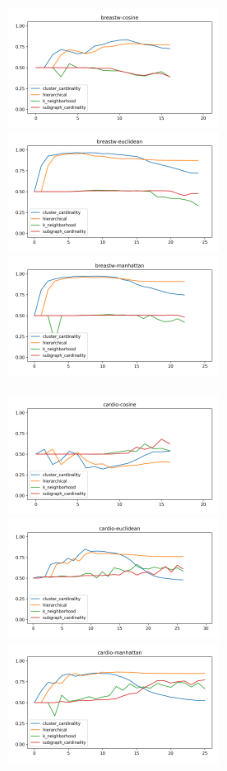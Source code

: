 \begin{figure}[!t]
\includegraphics[width=2.2in]{kdd/static/auc_vs_depth/breastw-cosine.png}
\includegraphics[width=2.2in]{kdd/static/auc_vs_depth/breastw-euclidean.png}
\includegraphics[width=2.2in]{kdd/static/auc_vs_depth/breastw-manhattan.png}

\includegraphics[width=2.2in]{kdd/static/auc_vs_depth/cardio-cosine.png}
\includegraphics[width=2.2in]{kdd/static/auc_vs_depth/cardio-euclidean.png}
\includegraphics[width=2.2in]{kdd/static/auc_vs_depth/cardio-manhattan.png}


\end{figure}
